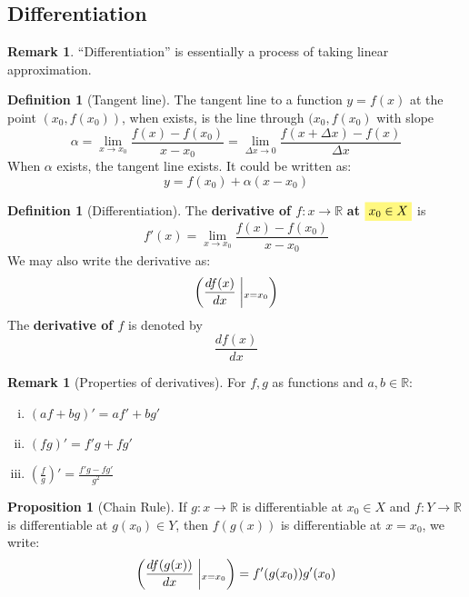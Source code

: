 \documentclass[12pt]{article}
\newcommand{\R}{{\mathbb R}}
\theoremstyle{definition}
\newtheorem{definition}[theorem]{Definition}
\newtheorem{proposition}[theorem]{Proposition}
\newtheorem{remark}[theorem]{Remark}
\theoremstyle{plain}
\newcommand{\highlight}[1]{%
 \colorbox{yellow!50}{$\displaystyle#1$}}
\newcommand{\suchthat}{\;\ifnum\currentgrouptype=16 \middle\fi|\;}
\begin{document}
\subsection{Differentiation}
\setcounter{theorem}{0}
\begin{remark}
    ``Differentiation'' is essentially a process of taking linear approximation.
\end{remark}

\begin{definition}
    [Tangent line]
    The tangent line to a function $y = f(x)$ at the point $(x_0, 
    f(x_0))$, when exists, is 
    the line through $(x_0, f(x_0)$ with slope 
        \[
            \alpha = \lim_{x \to x_0} \frac{f(x) - f(x_0)}{x - x_0} = 
            \lim_{\Delta x \to 0 } \frac{f(x + \Delta x) - f(x)}{\Delta x}
        \]
    When $\alpha$ exists, the tangent line exists. It could be written as:
    \[
        y = f(x_0) + \alpha(x - x_0)
    \]
\end{definition}

\begin{definition}
    [Differentiation]
    The \textbf{derivative of $f: x \to \R$} {\textbf{at} $\highlight{x_0 \in X}$} is 
    \[
        f'(x) = \lim_{x \to x_0} \frac{f(x) - f(x_0)}{ x - x_0}
    \]
    We may also write the derivative as: 
    \[
        \mleft( \frac{df(x)}{dx} \;\middle|_{x = x_0}
        \mright)
    \]
    The \textbf{derivative of $f$} is denoted by 
    \[
        \frac{df(x)}{dx}
    \]
\end{definition}


\begin{remark}
    [Properties of derivatives] For $f,g$ as functions and $a,b \in \R$:
    \begin{enumerate}[(i)]
        \item $(a f + b g) ' = a f' + b g'$
        \item $(fg)' = f'g + fg'$
        \item $\left( \frac{f}{g} \right)' = \frac{f'g - fg'}{g^2}$
    \end{enumerate}
\end{remark}
\begin{proposition}
    [Chain Rule] If $g: x\to \R$ is differentiable at $x_0 \in X$ and $f: Y \to 
    \R$ is differentiable at $g(x_0) \in Y$, then $f(g(x))$ is differentiable at 
    $x = x_0$, we write: 
    \[
        \mleft( 
            \frac{df(g(x))}{dx} \;\middle|_{x = x_0}
        \mright) 
        = f'(g(x_0)) g'(x_0)
    \]
\end{proposition}
\end{document}
